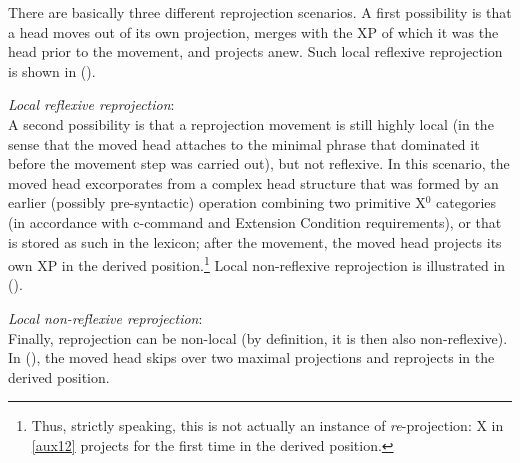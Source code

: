\documentclass[output=paper
,modfonts
,nonflat]{langsci/langscibook}
\begin{document}
There are basically three different reprojection scenarios. A first
possibility is that a head moves out of its own projection, merges
with the XP of which it was the head prior to the movement, and
projects anew. Such local reflexive reprojection is shown in (\Next). 

\ea\label{ex:mueller:24} {\itshape Local reflexive reprojection}:\\
\z
A second possibility is that a reprojection movement is still highly
local (in the sense that the moved head attaches to the minimal phrase
that dominated it before the movement step was carried out), but not
reflexive. In this scenario, the moved head excorporates from a complex
head structure that was formed by an earlier (possibly pre-syntactic) 
operation combining two primitive X$^0$ categories (in accordance with
c-command and Extension Condition requirements), or that is stored as
such in the lexicon; after the movement, the moved head projects its own
XP in the derived position.\footnote{Thus, strictly speaking, this is
  not actually an instance of {\itshape re}-projection: X in \ref{aux12}
  projects for the first time in the derived position.} Local non-reflexive
reprojection is illustrated in (\Next). 

\ea\label{ex:mueller:25} {\itshape Local \label{aux12}non-reflexive reprojection}:\\
\z
Finally, reprojection can be non-local (by definition, it is then also
non-reflexive). In (\Next), the moved head skips over two maximal
projections and reprojects in the derived position. 
\end{document}
